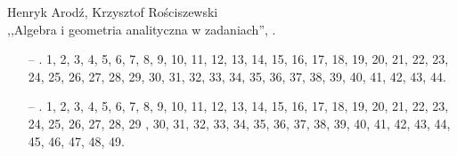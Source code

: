 \documentclass[a4paper,11pt]{article}
\newcommand{\cm}{\checkmark}
\begin{document}
\begin{center}
Henryk Arodź, Krzysztof Rościszewski\\
,,Algebra i geometria analityczna w zadaniach'', \cite{HAKRAGAZ}.
\end{center}
\begin{itemize}
\item[--] . 1, 2, 3, 4, 5, 6, 7, 8, 9, 10, 11, 12, 13, 14, 15, 16, 17, 18, 19, 20, 21, 22, 23, 24, 25, 26, 27, 28, 29, 30, 31, 32, 33, 34, 35, 36, 37, 38, 39, 40, 41, 42, 43, 44.
\item[--] . 1\cm, 2, 3\cm, 4, 5, 6\cm, 7\cm, 8, 9, 10, 11, 12, 13, 14, 15, 16, 17, 18, 19, 20, 21, 22, 23, 24, 25, 26, 27, 28, 29 , 30, 31, 32, 33, 34, 35, 36, 37, 38, 39, 40, 41, 42, 43, 44, 45, 46, 47, 48, 49.
\end{itemize}
\end{document}
